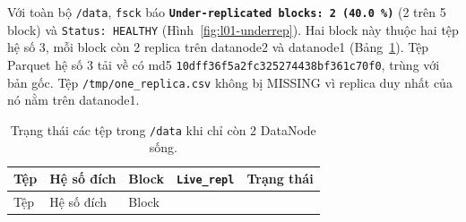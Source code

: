 \documentclass[
  12pt,
  a4paper,
]{article}
\begin{document}
Với toàn bộ \texttt{/data}, \texttt{fsck} báo
\textbf{\texttt{Under-replicated\ blocks:}\allowbreak{}\texttt{\ 2\ (40.}\allowbreak{}\texttt{0\ \%)}\allowbreak{}}
(2 trên 5 block) và \texttt{Status:\ HEALTHY}
(Hình~\ref{fig:l01-underrep}). Hai block này thuộc hai tệp hệ số 3, mỗi
block còn 2 replica trên datanode2 và datanode1
(Bảng~\ref{tbl:l01-underrep}). Tệp Parquet hệ số 3 tải về có md5
\texttt{10dff36f5a2fc325274438bf361c70f0}\allowbreak{}, trùng với bản
gốc. Tệp
\texttt{/}\allowbreak{}\texttt{tmp/}\allowbreak{}\texttt{one\_}\allowbreak{}\texttt{replica.}\allowbreak{}\texttt{csv}\allowbreak{}
không bị MISSING vì replica duy nhất của nó nằm trên datanode1.

\begin{longtable}[]{@{}
  >{\raggedright\arraybackslash}p{}
  >{\raggedright\arraybackslash}p{}
  >{\raggedright\arraybackslash}p{}
  >{\raggedright\arraybackslash}p{}
  >{\raggedright\arraybackslash}p{}@{}}
\caption{\label{tbl:l01-underrep}Trạng thái các tệp trong \texttt{/data}
khi chỉ còn 2 DataNode sống.}\tabularnewline
\toprule\noalign{}
\begin{minipage}[b]{\linewidth}\raggedright
Tệp
\end{minipage} & \begin{minipage}[b]{\linewidth}\raggedright
Hệ số đích
\end{minipage} & \begin{minipage}[b]{\linewidth}\raggedright
Block
\end{minipage} & \begin{minipage}[b]{\linewidth}\raggedright
\texttt{Live\_repl}
\end{minipage} & \begin{minipage}[b]{\linewidth}\raggedright
Trạng thái
\end{minipage} \\
\midrule\noalign{}
\endfirsthead
\toprule\noalign{}
\begin{minipage}[b]{\linewidth}\raggedright
Tệp
\end{minipage} & \begin{minipage}[b]{\linewidth}\raggedright
Hệ số đích
\end{minipage} & \begin{minipage}[b]{\linewidth}\raggedright
Block
\end{minipage} & \begin{minipage}[b]{\linewidth}\raggedright

\end{minipage}
\end{longtable}
\end{document}
